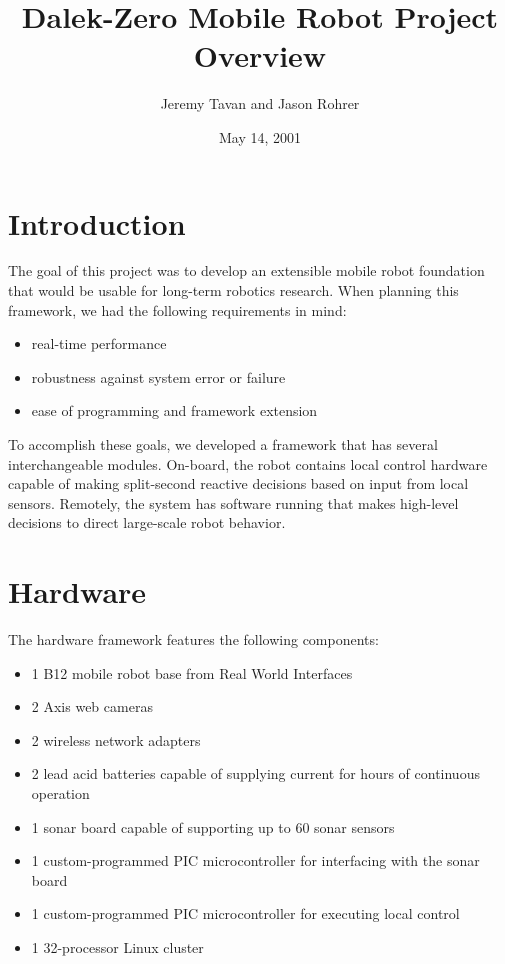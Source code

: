 \documentclass[12pt]{article}
\begin{document}
\title{Dalek-Zero Mobile Robot Project Overview}
\date{May 14, 2001}
\author{Jeremy Tavan and Jason Rohrer}

\maketitle

\section{Introduction}
The goal of this project was to develop an extensible mobile robot foundation that would be usable for long-term robotics research.  When planning this framework, we had the following requirements in mind:
\begin{itemize}
\item real-time performance
\item robustness against system error or failure
\item ease of programming and framework extension
\end{itemize}
To accomplish these goals, we developed a framework that has several interchangeable modules.  On-board, the robot contains local control hardware capable of making split-second reactive decisions based on input from local sensors.  Remotely, the system has software running that makes high-level decisions to direct large-scale robot behavior.
\section{Hardware}
The hardware framework features the following components:
\begin{itemize}
\item 1 B12 mobile robot base from Real World Interfaces
\item 2 Axis web cameras
\item 2 wireless network adapters
\item 2 lead acid batteries capable of supplying current for hours of continuous operation
\item 1 sonar board capable of supporting up to 60 sonar sensors
\item 1 custom-programmed PIC microcontroller for interfacing with the sonar board
\item 1 custom-programmed PIC microcontroller for executing local control
\item 1 32-processor Linux cluster
\end{itemize}
\end{document}
